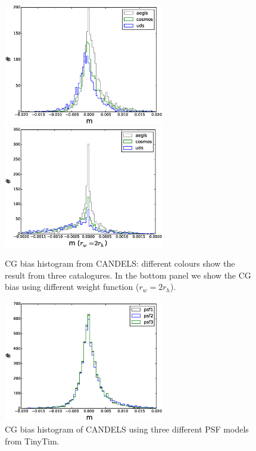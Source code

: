 \documentclass[useAMS,usenatbib]{mn2e}
\begin{document}
%
\begin{figure}
  \includegraphics[width=7.0cm]{zhiscgb.eps}
  \includegraphics[width=7.0cm]{zhiscgbno.eps}
\caption{CG bias histogram from CANDELS: different colours show the
  result from three catalogures. In the bottom panel we show the CG
  bias using different weight function ($r_w = 2r_h$).}
\label{fig:cgbhis}
\end{figure}
%
\begin{figure}
  \includegraphics[width=7.0cm]{zcgbhis_psf.eps}
  \caption{CG bias histogram of CANDELS using three different PSF
    models from TinyTim.}
  \label{fig:candelspsf}
\end{figure}
%
\end{document}
